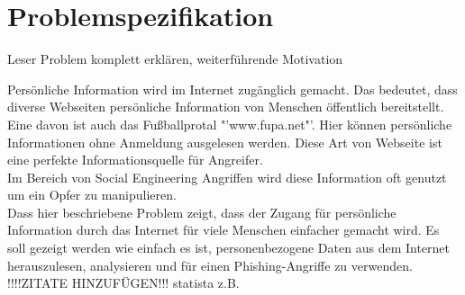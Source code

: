 

\chapter{Problemspezifikation}  %
\label{cha:Problemspezifikation} %
Leser Problem komplett erklären, weiterführende Motivation

Persönliche Information wird im Internet zugänglich gemacht. Das bedeutet, dass diverse Webseiten persönliche Information von Menschen öffentlich bereitstellt. Eine davon ist auch das Fußballprotal "'www.fupa.net"'. Hier können persönliche Informationen ohne Anmeldung ausgelesen werden. Diese Art von Webseite ist eine perfekte Informationsquelle für Angreifer.\\
Im Bereich von Social Engineering Angriffen wird diese Information oft genutzt um ein Opfer zu manipulieren.\\
Dass hier beschriebene Problem zeigt, dass der Zugang für persönliche Information durch das Internet für viele Menschen einfacher gemacht wird. Es soll gezeigt werden wie einfach es ist, personenbezogene Daten aus dem Internet herauszulesen, analysieren und für einen Phishing-Angriffe zu verwenden.
!!!!ZITATE HINZUFÜGEN!!! statista z.B.
